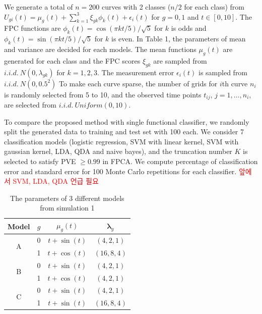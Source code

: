 \documentclass[eng]{csam}
\begin{document}
We generate a total of $n=200$ curves with 2 classes ($n/2$ for each class) from $U_{gi}(t) = \mu_g(t) + \sum_{k=1}^3 \xi_{gk} \phi_k(t) + \epsilon_i(t)$ for $g = 0, 1$ and $t \in [0, 10]$. The FPC functions are $\phi_k(t) = \cos(\pi kt /5) / \sqrt{5}$ for $k$ is odds and $\phi_k(t) = \sin(\pi kt /5) / \sqrt{5}$ for $k$ is even. In Table 1, the parameters of mean and variance are decided for each models. The mean functions $\mu_g(t)$ are generated for each class and the FPC scores $\xi_{gk}$ are sampled from $i.i.d. \ N(0, \lambda_{gk})$ for $k=1,2,3$. The measurement error $\epsilon_i(t)$ is sampled from $i.i.d. \ N(0, 0.5^2)$ To make each curve sparse, the number of grids for $i$th curve $n_i$ is randomly selected from 5 to 10, and the observed time points $t_{ij}$, $j=1, \dots, n_i$, are selected from $i.i.d. \ Uniform(0, 10)$.

To compare the proposed method with single functional classifier, we randomly split the generated data to training and test set with 100 each. We consider 7 classification models (logistic regression, SVM with linear kernel, SVM with gaussian kernel, LDA, QDA and naive bayes), and the truncation number $K$ is selected to satisfy PVE $\ge 0.99$ in FPCA. We compute percentage of classification error and standard error for 100 Monte Carlo repetitions for each classifier.
\textcolor{red}{앞에서 SVM, LDA, QDA 언급 필요}



%

\begin{table}[ht]
	\footnotesize
	\centering
	\caption{The parameters of 3 different models from simulation 1}
	\tabcolsep=11.5pt
	\begin{tabular}{cccc}
		\hline \hline
		Model & $g$ & $\mu_g(t)$ & $\boldsymbol\lambda_g$ \\ 
		\hline
		\multirow{2}{*}{A} & 0 & $t + \sin(t)$ & $(4, 2, 1)$ \\
		                   & 1 & $t + \cos(t)$ & $(16, 8, 4)$ \\
		\hline
		\multirow{2}{*}{B} & 0 & $t + \sin(t)$ & $(4, 2, 1)$ \\
						   & 1 & $t + \cos(t)$ & $(4, 2, 1)$ \\
		\hline
		\multirow{2}{*}{C} & 0 & $t + \sin(t)$ & $(4, 2, 1)$ \\
		                   & 1 & $t + \sin(t)$ & $(16, 8, 4)$ \\
		\hline \hline
	\end{tabular}
\end{table}
\end{document}
